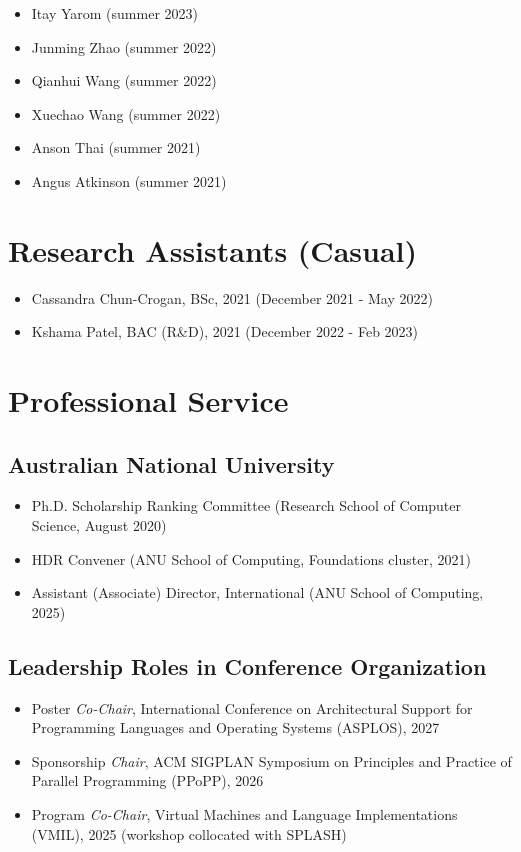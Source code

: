 \documentclass[singlecolumn,singlespace,11pt,a4paper]{article}
\begin{document}
\begin{itemize}

\item Itay Yarom (summer 2023)
\item Junming Zhao (summer 2022)
\item Qianhui Wang (summer 2022)
\item Xuechao Wang (summer 2022)
\item Anson Thai (summer 2021)
\item Angus Atkinson (summer 2021)

\end{itemize}

\section*{Research Assistants (Casual)}
\begin{itemize}
\item Cassandra Chun-Crogan, BSc, 2021 (December 2021 - May 2022)
\item Kshama Patel, BAC (R\&D), 2021 (December 2022 - Feb 2023)
\end{itemize}

\section*{Professional Service}

\subsection*{Australian National University}
\begin{itemize}
\item Ph.D. Scholarship Ranking Committee (Research School of Computer Science, August 2020)
\item HDR Convener (ANU School of Computing, Foundations cluster, 2021)
\item Assistant (Associate) Director, International (ANU School of Computing, 2025)
\end{itemize}


\subsection*{Leadership Roles in Conference Organization}
\begin{itemize}
\item Poster \textit{Co-Chair}, International Conference on Architectural Support for Programming Languages and Operating Systems (ASPLOS), 2027
\item Sponsorship \textit{Chair}, ACM SIGPLAN Symposium on Principles and Practice of Parallel Programming (PPoPP), 2026
\item Program \textit{Co-Chair}, Virtual Machines and Language Implementations (VMIL), 2025 (workshop collocated with SPLASH)
\end{itemize}
\end{document}
